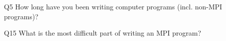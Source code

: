 \begin{description}%
\item{Q5} How long have you been writing computer programs (incl. non-MPI programs)?%
\item{Q15} What is the most difficult part of writing an MPI program?%
\end{description}%
